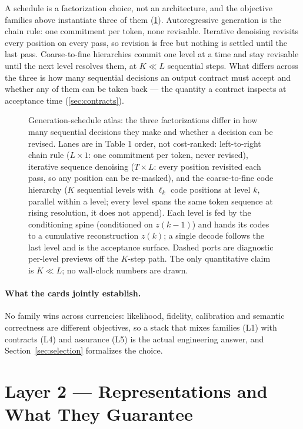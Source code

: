 \documentclass[11pt]{article}
\begin{document}
A schedule is a factorization choice, not an architecture, and the objective families above
instantiate three of them (\cref{fig:schedule-atlas}). Autoregressive generation is the chain
rule: one commitment per token, none revisable. Iterative denoising revisits every position on
every pass, so revision is free but nothing is settled until the last pass. Coarse-to-fine
hierarchies commit one level at a time and stay revisable until the next level resolves them,
at $K \ll L$ sequential steps. What differs across the three is how many sequential decisions
an output contract must accept and whether any of them can be taken back --- the quantity a
contract inspects at acceptance time (\cref{sec:contracts}).

\begin{figure}[t]\centering
  \resizebox{\linewidth}{!}{}
  \caption{ Generation-schedule atlas: the three factorizations differ in how many sequential decisions they make and whether a decision can be revised. Lanes are in Table 1 order, not cost-ranked: left-to-right chain rule ($L\times1$: one commitment per token, never revised), iterative sequence denoising ($T\times L$: every position revisited each pass, so any position can be re-masked), and the coarse-to-fine code hierarchy ($K$ sequential levels with $\ell_k$ code positions at level $k$, parallel within a level; every level spans the same token sequence at rising resolution, it does not append). Each level is fed by the conditioning spine (conditioned on $z(k{-}1)$) and hands its codes to a cumulative reconstruction $z(k)$; a single decode follows the last level and is the acceptance surface. Dashed ports are diagnostic per-level previews off the $K$-step path. The only quantitative claim is $K\ll L$; no wall-clock numbers are drawn.}
  \label{fig:schedule-atlas}
\end{figure}


\paragraph{What the cards jointly establish.}
No family wins across currencies: likelihood, fidelity, calibration and semantic correctness
are different objectives, so a stack that mixes families (L1) with contracts (L4) and
assurance (L5) is the actual engineering answer, and Section~\ref{sec:selection} formalizes
the choice.


\section{Layer 2 --- Representations and What They Guarantee}\label{sec:representations}

\FloatBarrier
\end{document}
